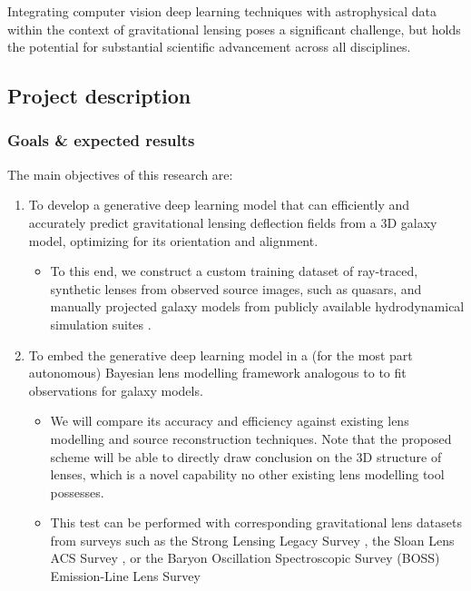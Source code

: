\documentclass[a4paper,10pt]{article}
\begin{document}
Integrating computer vision deep learning techniques with
astrophysical data within the context of gravitational lensing poses a
significant challenge, but holds the potential for substantial
scientific advancement across all disciplines.

\subsection{Project description}
\label{sec:org0260ae0}

\subsubsection{Goals \& expected results}
\label{sec:org47ed191}
\label{sec:goals}

The main objectives of this research are:
\begin{enumerate}[leftmargin=*, noitemsep]
\item To develop a generative deep learning model that can efficiently
and accurately predict gravitational lensing deflection fields from
a 3D galaxy model, optimizing for its orientation and alignment.
\begin{itemize}[leftmargin=*]
\item To this end, we construct a custom training dataset of
ray-traced, synthetic lenses from observed source images, such as
quasars, and manually projected galaxy models from publicly
available hydrodynamical simulation suites
\citep{Springel17,Nelson18,Dave19}.
\end{itemize}
\item To embed the generative deep learning model in a (for the most part
autonomous) Bayesian lens modelling framework analogous to
\cite{Adam22,Denzel21,Morningstar19,Hezaveh17} to fit
observations for galaxy models.
\begin{itemize}[leftmargin=*]
\item We will compare its accuracy and efficiency against existing lens
modelling and source reconstruction techniques. Note that the
proposed scheme will be able to directly draw conclusion on the
3D structure of lenses, which is a novel capability no other
existing lens modelling tool possesses.
\item This test can be performed with corresponding gravitational lens
datasets from surveys such as the Strong Lensing Legacy Survey
\citep[SL2S:][]{Gavazzi12,Sonnenfeld15}, the Sloan Lens ACS
Survey \citep[SLACS:][]{Bolton2006,Shu17}, or the Baryon
Oscillation Spectroscopic Survey (BOSS) Emission-Line Lens Survey

\end{itemize}
\end{enumerate}
\end{document}
